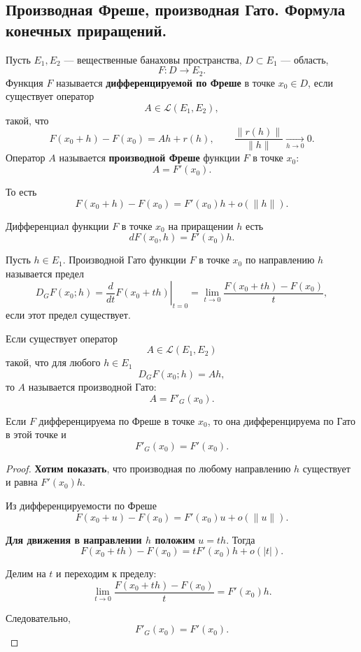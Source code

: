 \subsection{Производная Фреше, производная Гато. Формула конечных приращений.}

\begin{definition}
	Пусть \(E_1,E_2\) --- вещественные банаховы пространства,
	\(D\subset E_1\) --- область,
	\[
	F:D\to E_2.
	\]
	Функция \(F\) называется \textbf{дифференцируемой по Фреше} в точке
	\(x_0\in D\), если существует оператор
	\[
	A\in\mathcal L(E_1,E_2),
	\]
	такой, что
	\[
	F(x_0+h)-F(x_0)=Ah+r(h),
	\qquad
	\frac{\|r(h)\|}{\|h\|}\xrightarrow[h\to0]{}0.
	\]
	Оператор \(A\) называется \textbf{производной Фреше} функции \(F\) в точке \(x_0\):
	\[
	A=F'(x_0).
	\]
\end{definition}

То есть
\[
F(x_0+h)-F(x_0)
=
F'(x_0)h+o(\|h\|).
\]

\begin{definition}[Дифференциал]
	Дифференциал функции \(F\) в точке \(x_0\) на приращении \(h\) есть
	\[
	dF(x_0,h)=F'(x_0)h.
	\]
\end{definition}

\begin{definition}
	Пусть \(h\in E_1\).
	Производной Гато функции \(F\) в точке \(x_0\) по направлению \(h\)
	называется предел
	\[
	D_GF(x_0;h)
	=
	\left.\frac{d}{dt}F(x_0+th)\right|_{t=0}
	=
	\lim_{t\to0}
	\frac{F(x_0+th)-F(x_0)}{t},
	\]
	если этот предел существует.
	
	Если существует оператор
	\[
	A\in\mathcal L(E_1,E_2)
	\]
	такой, что для любого \(h\in E_1\)
	\[
	D_GF(x_0;h)=Ah,
	\]
	то \(A\) называется производной Гато:
	\[
	A=F'_G(x_0).
	\]
\end{definition}

\begin{theorem}
	Если \(F\) дифференцируема по Фреше в точке \(x_0\), то она
	дифференцируема по Гато в этой точке и
	\[
	F'_G(x_0)=F'(x_0).
	\]
\end{theorem}

\begin{proof}
	\textbf{Хотим показать}, что производная по любому направлению \(h\) существует
	и равна \(F'(x_0)h\).
	
	Из дифференцируемости по Фреше
	\[
	F(x_0+u)-F(x_0)=F'(x_0)u+o(\|u\|).
	\]
	
	\textbf{Для движения в направлении \(h\) положим} \(u=th\). Тогда
	\[
	F(x_0+th)-F(x_0)
	=
	tF'(x_0)h+o(|t|).
	\]
	
	Делим на \(t\) и переходим к пределу:
	\[
	\lim_{t\to0}
	\frac{F(x_0+th)-F(x_0)}{t}
	=
	F'(x_0)h.
	\]
	
	Следовательно,
	\[
	F'_G(x_0)=F'(x_0).
	\]
\end{proof}

